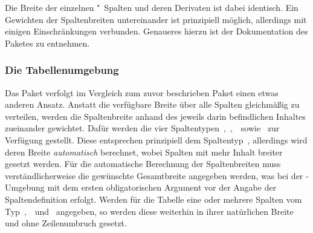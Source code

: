 \documentclass[%
  english,ngerman,%
  geometry=no,DIV=12,automark,%
]{tudscrartcl}
\begin{document}
\InputCode\noindent
%
Die Breite der einzelnen "~Spalten und deren Derivaten ist dabei 
identisch. Ein Gewichten der Spaltenbreiten untereinander ist prinzipiell 
möglich, allerdings mit einigen Einschränkungen verbunden. Genaueres hierzu ist 
der Dokumentation des Paketes  zu entnehmen.

\subsubsection{Die Tabellenumgebung }
\label{sec:tabulary}
Das Paket  verfolgt im Vergleich zum zuvor beschrieben Paket 
 einen etwas anderen Ansatz. Anstatt die verfügbare Breite 
über alle Spalten gleichmäßig zu verteilen, werden die Spaltenbreite anhand des 
jeweils darin befindlichen Inhaltes zueinander gewichtet. Dafür werden die vier 
Spaltentypen~,~,~~sowie~ zur Verfügung 
gestellt. Diese entsprechen prinzipiell dem Spaltentyp~, allerdings 
wird deren Breite \emph{automatisch} berechnet, wobei Spalten mit mehr Inhalt 
breiter gesetzt werden. Für die automatische Berechnung der Spaltenbreiten muss 
verständlicherweise die gewünschte Gesamtbreite angegeben werden, was bei der 
-Umgebung mit dem ersten obligatorischen Argument vor der 
Angabe der Spaltendefinition erfolgt. Werden für die Tabelle eine oder mehrere 
Spalten vom Typ~,~~und~ angegeben, so werden 
diese weiterhin in ihrer natürlichen Breite und ohne Zeilenumbruch gesetzt. 
\end{document}

